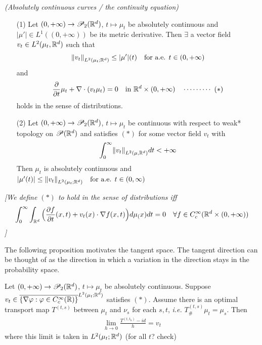 \documentclass[12pt,a4paper]{article}
\begin{document}
 \emph{(Absolutely continuous curves / the continuity equation)}
\begin{itemize}
\item[(1)] Let $(0, + \infty) \rightarrow \mathscr{P}_2(\mathbb{R}^d)$, $t\mapsto \mu_t$ be absolutely continuous and $|\mu'| \in L^1((0, + \infty))$ be its metric derivative. Then $\exists$ a vector field $v_t \in L^2(\mu_t, \mathbb{R}^d)$ such that 
\begin{align*}
\snorms{v_t}{L^2(\mu_t;\reals^d)} \leq |\mu'|(t) \quad \text{for a.e. }t\in (0, + \infty)
\end{align*}
and
\begin{align*}
\frac{\partial}{\partial t} \mu_t + \nabla \cdot (v_t \mu_t) =0 \quad \text{in }\mathbb{R}^d \times(0, + \infty)  \quad \cdots\cdots\cdots\,\,(*)
\end{align*}
holds in the sense of distributions.
\item[(2)] Let $(0, +\infty) \rightarrow \mathscr{P}_2(\mathbb{R}^d)$, $t\mapsto \mu_t$ be continuous with respect to weak* topology on $\mathscr{P}(\mathbb{R}^d)$ and satisfies $(*)$ for some vector field $v_t$ with
\begin{align*}
\int_0^{\infty} \snorms{v_t}{L^2(\mu, \reals^d)} dt < +\infty
\end{align*}
Then $\mu_t$ is absolutely continuous and $|\mu'(t)| \leq \snorms{v_t}{L^2(\mu_t ; \reals^d)} \quad \text{for a.e. }t\in (0, \infty)$
\end{itemize}
\emph{[We define $(*)$ to hold in the sense of distributions iff
\begin{align*}
\int_0^{\infty} \int_{\mathbb{R}^d} \Big( \frac{\partial f}{\partial t}(x, t) + v_t(x) \cdot \nabla f(x,t) \Big) d\mu_(x) dt =0 \quad \forall f\in C_c^{\infty}(\mathbb{R}^d \times (0, +\infty))
\end{align*}]}
\s

The following proposition motivates the tangent space. The tangent direction can be thought of as the direction in which a variation in the direction stays in the probability space.
\s

 Let $(0, +\infty) \rightarrow \mathscr{P}_2(\mathbb{R}^d)$, $t\mapsto \mu_t$ be absolutely continuous. Suppose $v_t \in \overline{ \{\nabla \varphi : \varphi \in C_c^{\infty}(\mathbb{R})\}}^{L^2(\mu_t ; \mathbb{R}^d)}$ satisfies $(*)$. Assume there is an optimal transport map $T^{(t,s)}$ between $\mu_t$ and $\nu_s$ for each $s,t$, \textit{i.e.} $T_{\#}^{(t,s)} \mu_t = \mu_s$. Then
\begin{align*}
\lim_{h\rightarrow 0} \frac{T^{(t, t_h)}- id}{h} = v_t
\end{align*}
where this limit is taken in $L^2(\mu_t ; \mathbb{R}^d)$ (for all $t$? check) 
\s
\end{document}

